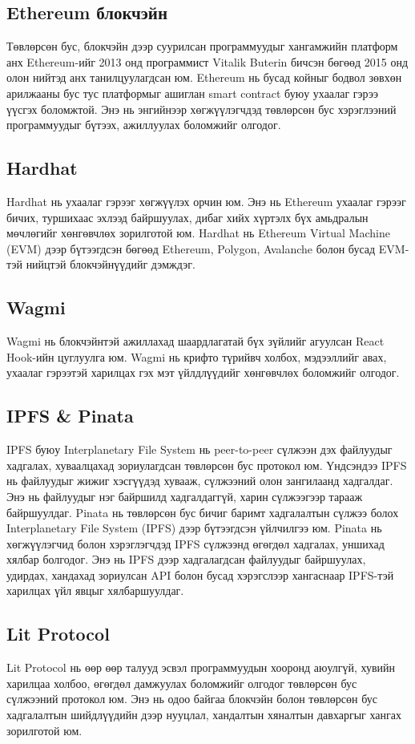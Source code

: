 \subsection{Ethereum блокчэйн}
Төвлөрсөн бус, блокчэйн дээр суурилсан программуудыг хангамжийн платформ анх Ethereum-ийг 2013 онд программист Vitalik Buterin бичсэн бөгөөд 2015 онд олон нийтэд анх танилцуулагдсан юм. Ethereum нь бусад койныг бодвол зөвхөн арилжааны бус тус платформыг ашиглан smart contract буюу ухаалаг гэрээ үүсгэх боломжтой. Энэ нь энгийнээр хөгжүүлэгчдэд төвлөрсөн бус хэрэглээний программуудыг бүтээх, ажиллуулах боломжийг олгодог.

\subsection{Hardhat}
Hardhat нь ухаалаг гэрээг хөгжүүлэх орчин юм. Энэ нь Ethereum ухаалаг гэрээг бичих, туршихаас эхлээд байршуулах, дибаг хийх хүртэлх бүх амьдралын мөчлөгийг хөнгөвчлөх зорилготой юм. Hardhat нь Ethereum Virtual Machine (EVM) дээр бүтээгдсэн бөгөөд Ethereum, Polygon, Avalanche болон бусад EVM-тэй нийцтэй блокчэйнүүдийг дэмждэг.

\subsection{Wagmi}
Wagmi нь блокчэйнтэй ажиллахад шаардлагатай бүх зүйлийг агуулсан React Hook-ийн цуглуулга юм. Wagmi нь крифто түрийвч холбох, мэдээллийг авах, ухаалаг гэрээтэй харилцах гэх мэт үйлдлүүдийг хөнгөвчлөх боломжийг олгодог.

\subsection{IPFS \& Pinata}
IPFS буюу Interplanetary File System нь peer-to-peer сүлжээн дэх файлуудыг хадгалах, хуваалцахад зориулагдсан төвлөрсөн бус протокол юм. Үндсэндээ IPFS нь файлуудыг жижиг хэсгүүдэд хувааж, сүлжээний олон зангилаанд хадгалдаг. Энэ нь файлуудыг нэг байршилд хадгалдаггүй, харин сүлжээгээр тарааж байршуулдаг.
Pinata нь төвлөрсөн бус бичиг баримт хадгалалтын сүлжээ болох Interplanetary File System (IPFS) дээр бүтээгдсэн үйлчилгээ юм. Pinata нь хөгжүүлэгчид болон хэрэглэгчдэд IPFS сүлжээнд өгөгдөл хадгалах, уншихад хялбар болгодог. Энэ нь IPFS дээр хадгалагдсан файлуудыг байршуулах, удирдах, хандахад зориулсан API болон бусад хэрэгслээр хангаснаар IPFS-тэй харилцах үйл явцыг хялбаршуулдаг.

\subsection{Lit Protocol}
Lit Protocol нь өөр өөр талууд эсвэл программуудын хооронд аюулгүй, хувийн харилцаа холбоо, өгөгдөл дамжуулах боломжийг олгодог төвлөрсөн бус сүлжээний протокол юм. Энэ нь одоо байгаа блокчэйн болон төвлөрсөн бус хадгалалтын шийдлүүдийн дээр нууцлал, хандалтын хяналтын давхаргыг хангах зорилготой юм.

